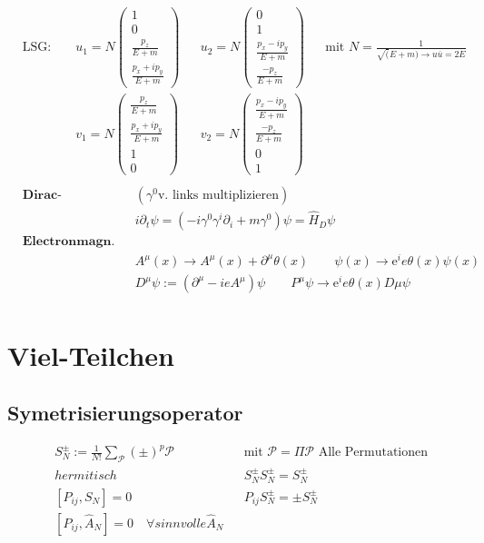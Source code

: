 \documentclass[10pt,a4paper,notitlepage]{scrartcl}
\begin{document}
\begin{align*}
    &\text{LSG: } && u_1 = N \begin{pmatrix} 1 \\ 0 \\ \frac{p_z}{E+m} \\ \frac{p_x+ip_y}{E+m}\end{pmatrix}
    && u_2 = N \begin{pmatrix} 0 \\ 1 \\ \frac{p_x-ip_y}{E+m} \\ \frac{-p_z}{E+m}\end{pmatrix}
    && \text{mit } N = \frac{1}{\sqrt(E+m) \to u\overline{u} = 2E}\\
    &&& v_1 = N \begin{pmatrix} \frac{p_z}{E+m} \\ \frac{p_x+ip_y}{E+m} \\1 \\0 \end{pmatrix}
    && v_2 = N \begin{pmatrix} \frac{p_x-ip_y}{E+m} \\ \frac{-p_z}{E+m} \\ 0 \\ 1\end{pmatrix}
    &&\\
\end{align*}
\begin{align*}
    &\textbf{Dirac-Hamiltonian:} && (\gamma^0 \text{v. links multiplizieren}) &&\\
    & && i\partial_t \psi = (-i\gamma^0\gamma^i\partial_i + m \gamma^0)\psi = \hat H_D \psi\\
    & \textbf{Electronmagn. Eichinvarianz:}\\
    &&&A^\mu(x) \to A^\mu(x) + \partial^\mu\theta(x) \qquad \psi(x) \to \text{e}^ie\theta(x)\psi(x)\\
    &&&D^\mu \psi := (\partial^\mu-ieA^\mu)\psi \qquad P^\mu\psi \to \text{e}^ie\theta(x)D\mu \psi\\
\end{align*}

\section*{Viel-Teilchen}
\subsection*{Symetrisierungsoperator}
\begin{align*}
    & S_N^\pm := \frac{1}{N!}\sum_\mathcal{P}(\pm)^p \mathcal{P} && \text{mit } \mathcal{P} =
    \Pi \mathcal{P} \text{ Alle Permutationen}\\
    & hermitisch && S_N^{\pm}S_N^{\pm}=S_N^{\pm}\\
    & [P_{ij}, S_N] = 0 && P_{ij}S_N^{\pm} = \pm S_N^{\pm} \\
    & [P_{ij},\hat A_N]=0 \quad \forall sinnvolle \hat A_N\\
\end{align*}
\end{document}
